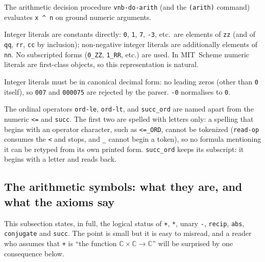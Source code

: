 The arithmetic decision procedure \texttt{vnb-do-arith} (and the
\texttt{(arith)} command) evaluates \texttt{x \^{} n} on ground
numeric arguments.

\noindent
Integer literals are constants directly: \texttt{0}, \texttt{1},
\texttt{7}, \texttt{-3}, etc.\ are elements of \texttt{zz} (and of
\texttt{qq}, \texttt{rr}, \texttt{cc} by inclusion); non-negative integer
literals are additionally elements of \texttt{nn}.  No subscripted
forms (\texttt{0\_ZZ}, \texttt{1\_RR}, etc.) are used.  In MIT~Scheme
numeric literals are first-class objects, so this representation is
natural.

Integer literals must be in canonical decimal form: no leading zeros
(other than \texttt{0} itself), so \texttt{007} and \texttt{000075} are
rejected by the parser.  \texttt{-0} normalises to \texttt{0}.

The ordinal operators \texttt{ord-le}, \texttt{ord-lt}, and
\texttt{succ\_ord} are named apart from the numeric \texttt{<=} and
\texttt{succ}.  The first two are spelled with letters only: a
spelling that begins with an operator character, such as
\texttt{<=\_ORD}, cannot be tokenized
(\texttt{read-op} consumes the \texttt{<} and stops, and \texttt{\_}
cannot begin a token), so no formula mentioning it can be retyped
from its own printed form.  \texttt{succ\_ord} keeps its subscript: it
begins with a letter and reads back.

\subsection{The arithmetic symbols: what they are, and what the axioms say}
\label{sec:arith-symbols}

This subsection states, in full, the logical status of \texttt{+},
\texttt{*}, unary \texttt{-}, \texttt{recip}, \texttt{abs},
\texttt{conjugate} and \texttt{succ}.  The point is small but it is easy to
misread, and a reader who assumes that \texttt{+} is ``the function
$\mathbb{C} \times \mathbb{C} \to \mathbb{C}$'' will be surprised by one
consequence below.

